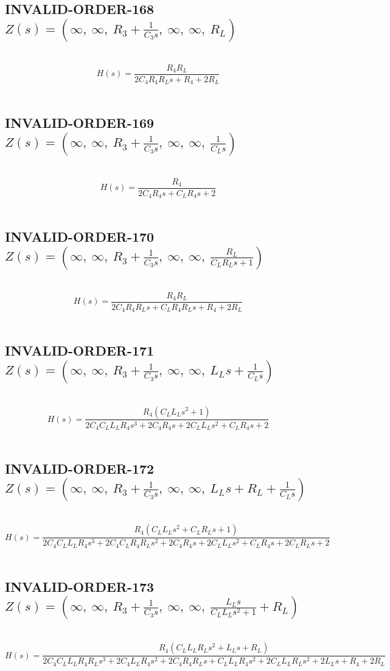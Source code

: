 \documentclass{article}
\begin{document}
\subsection{INVALID-ORDER-168 $Z(s) = \left( \infty, \  \infty, \  R_{3} + \frac{1}{C_{3} s}, \  \infty, \  \infty, \  R_{L}\right)$ } \ 
\textbf{\[H(s) = \frac{R_{4} R_{L}}{2 C_{4} R_{4} R_{L} s + R_{4} + 2 R_{L}}\] } \ 
\subsection{INVALID-ORDER-169 $Z(s) = \left( \infty, \  \infty, \  R_{3} + \frac{1}{C_{3} s}, \  \infty, \  \infty, \  \frac{1}{C_{L} s}\right)$ } \ 
\textbf{\[H(s) = \frac{R_{4}}{2 C_{4} R_{4} s + C_{L} R_{4} s + 2}\] } \ 
\subsection{INVALID-ORDER-170 $Z(s) = \left( \infty, \  \infty, \  R_{3} + \frac{1}{C_{3} s}, \  \infty, \  \infty, \  \frac{R_{L}}{C_{L} R_{L} s + 1}\right)$ } \ 
\textbf{\[H(s) = \frac{R_{4} R_{L}}{2 C_{4} R_{4} R_{L} s + C_{L} R_{4} R_{L} s + R_{4} + 2 R_{L}}\] } \ 
\subsection{INVALID-ORDER-171 $Z(s) = \left( \infty, \  \infty, \  R_{3} + \frac{1}{C_{3} s}, \  \infty, \  \infty, \  L_{L} s + \frac{1}{C_{L} s}\right)$ } \ 
\textbf{\[H(s) = \frac{R_{4} \left(C_{L} L_{L} s^{2} + 1\right)}{2 C_{4} C_{L} L_{L} R_{4} s^{3} + 2 C_{4} R_{4} s + 2 C_{L} L_{L} s^{2} + C_{L} R_{4} s + 2}\] } \ 
\subsection{INVALID-ORDER-172 $Z(s) = \left( \infty, \  \infty, \  R_{3} + \frac{1}{C_{3} s}, \  \infty, \  \infty, \  L_{L} s + R_{L} + \frac{1}{C_{L} s}\right)$ } \ 
\textbf{\[H(s) = \frac{R_{4} \left(C_{L} L_{L} s^{2} + C_{L} R_{L} s + 1\right)}{2 C_{4} C_{L} L_{L} R_{4} s^{3} + 2 C_{4} C_{L} R_{4} R_{L} s^{2} + 2 C_{4} R_{4} s + 2 C_{L} L_{L} s^{2} + C_{L} R_{4} s + 2 C_{L} R_{L} s + 2}\] } \ 
\subsection{INVALID-ORDER-173 $Z(s) = \left( \infty, \  \infty, \  R_{3} + \frac{1}{C_{3} s}, \  \infty, \  \infty, \  \frac{L_{L} s}{C_{L} L_{L} s^{2} + 1} + R_{L}\right)$ } \ 
\textbf{\[H(s) = \frac{R_{4} \left(C_{L} L_{L} R_{L} s^{2} + L_{L} s + R_{L}\right)}{2 C_{4} C_{L} L_{L} R_{4} R_{L} s^{3} + 2 C_{4} L_{L} R_{4} s^{2} + 2 C_{4} R_{4} R_{L} s + C_{L} L_{L} R_{4} s^{2} + 2 C_{L} L_{L} R_{L} s^{2} + 2 L_{L} s + R_{4} + 2 R_{L}}\] } \ 
\end{document}
